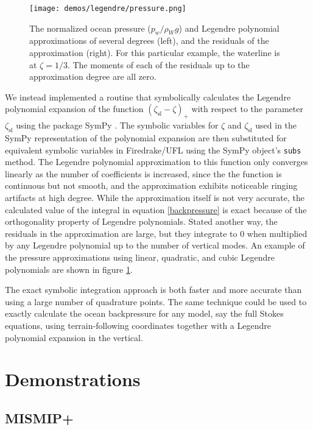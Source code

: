 \documentclass{article}
\theoremstyle{definition}
\theoremstyle{plain}
\begin{document}
\begin{figure}[h]
    \texttt{[image: demos/legendre/pressure.png]}
    \caption{The normalized ocean pressure ($p_w / \rho_Wg$) and Legendre polynomial approximations of several degrees (left), and the residuals of the approximation (right).
    For this particular example, the waterline is at $\zeta = 1/3$.
    The moments of each of the residuals up to the approximation degree are all zero.}
    \label{fig:legendre}
\end{figure}

We instead implemented a routine that symbolically calculates the Legendre polynomial expansion of the function $(\zeta_{\text{sl}} - \zeta)_+$ with respect to the parameter $\zeta_{\text{sl}}$ using the package SymPy \citep{sympy}.
The symbolic variables for $\zeta$ and $\zeta_{\text{sl}}$ used in the SymPy representation of the polynomial expansion are then substituted for equivalent symbolic variables in Firedrake/UFL using the SymPy object's \texttt{subs} method.
The Legendre polynomial approximation to this function only converges linearly as the number of coefficients is increased, since the the function is continuous but not smooth, and the approximation exhibits noticeable ringing artifacts at high degree.
While the approximation itself is not very accurate, the calculated value of the integral in equation \eqref{backpressure} is exact because of the orthogonality property of Legendre polynomials.
Stated another way, the residuals in the approximation are large, but they integrate to 0 when multiplied by any Legendre polynomial up to the number of vertical modes.
An example of the pressure approximations using linear, quadratic, and cubic Legendre polynomials are shown in figure \ref{fig:legendre}.

The exact symbolic integration approach is both faster and more accurate than using a large number of quadrature points.
The same technique could be used to exactly calculate the ocean backpressure for any model, say the full Stokes equations, using terrain-following coordinates together with a Legendre polynomial expansion in the vertical.


\section{Demonstrations}

\subsection{MISMIP+}
\end{document}
